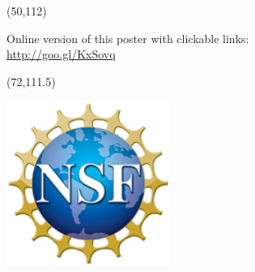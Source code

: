 \documentclass[final]{beamer}
\begin{document}
\begin{frame}{}
\begin{textblock}{24.0}(50,112)
\begin{flushleft}
Online version of this poster with clickable links: \\
\href{http://goo.gl/KxSovq}{http://goo.gl/KxSovq}
\end{flushleft}
\end{textblock}

\begin{textblock}{10.0}(72,111.5)
\begin{flushright}
\includegraphics[width=0.4\textwidth]{images/nsf1.jpg}
\end{flushright}
\end{textblock}


\end{frame}
\end{document}
